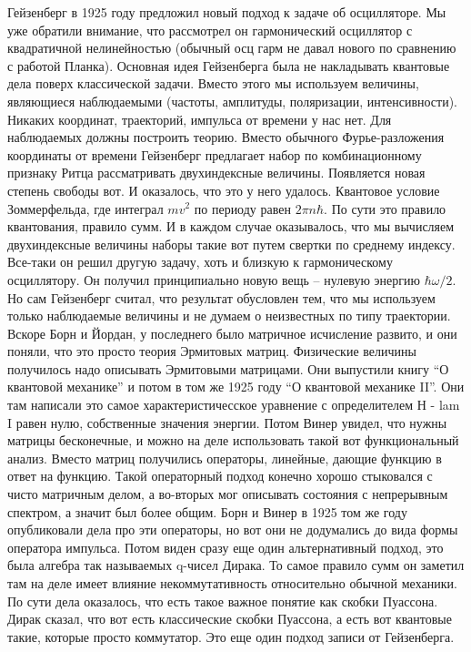 \documentclass[a4paper, 12pt]{article}
\begin{document}
Гейзенберг в 1925 году предложил новый подход к задаче об осцилляторе. 
Мы уже обратили внимание, что рассмотрел он гармонический осциллятор 
с квадратичной нелинейностью (обычный осц гарм не давал нового по 
сравнению с работой Планка). Основная идея Гейзенберга была не 
накладывать квантовые дела поверх классической задачи. Вместо этого мы 
используем величины, являющиеся наблюдаемыми (частоты, амплитуды, 
поляризации, интенсивности). Никаких координат, траекторий, импульса от 
времени у нас нет. Для наблюдаемых должны построить теорию. Вместо 
обычного Фурье-разложения координаты от времени Гейзенберг предлагает 
набор по комбинационному признаку Ритца рассматривать двухиндексные 
величины. Появляется новая степень свободы вот. И оказалось, что это 
у него удалось. Квантовое условие Зоммерфельда, где интеграл $mv^2$ по 
периоду равен $2\pi n \hbar$. По сути это правило квантования, правило 
сумм. И в каждом случае оказывалось, что мы вычисляем двухиндексные 
величины наборы такие вот путем свертки по среднему индексу. Все-таки он 
решил другую задачу, хоть и близкую к гармоническому осциллятору. Он 
получил принципиально новую вещь -- нулевую энергию $\hbar\omega/2$. Но 
сам Гейзенберг считал, что результат обусловлен тем, что мы используем 
только наблюдаемые величины и не думаем о неизвестных по типу 
траектории. Вскоре Борн и Йордан, у последнего было матричное исчисление 
развито, и они поняли, что это просто теория Эрмитовых матриц. 
Физические величины получилось надо описывать Эрмитовыми матрицами. Они 
выпустили книгу ``О квантовой механике'' и потом в том же 1925 году ``О 
квантовой механике II''. Они там написали это самое характеристичесское 
уравнение с определителем Н - lam I равен нулю, собственные значения 
энергии. Потом Винер увидел, что нужны матрицы бесконечные, и можно на 
деле использовать такой вот функциональный анализ. Вместо матриц 
получились операторы, линейные, дающие функцию в ответ на функцию. Такой 
операторный подход конечно хорошо стыковался с чисто матричным делом, 
а во-вторых мог описывать состояния с непрерывным спектром, а значит был 
более общим. Борн и Винер в 1925 том же году опубликовали дела про эти 
операторы, но вот они не додумались до вида формы оператора импульса. 
Потом виден сразу еще один альтернативный подход, это была алгебра так 
называемых q-чисел Дирака. То самое правило сумм он заметил там на деле 
имеет влияние некоммутативность относительно обычной механики. По сути 
дела оказалось, что есть такое важное понятие как скобки Пуассона. Дирак 
сказал, что вот есть классические скобки Пуассона, а есть вот квантовые 
такие, которые просто коммутатор. Это еще один подход записи от 
Гейзенберга.
\end{document}

